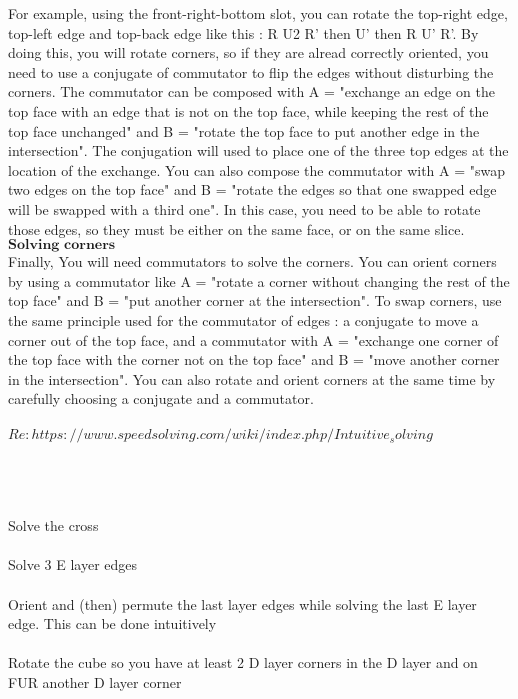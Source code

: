 \documentclass{article}
\begin{document}
For example, using the front-right-bottom slot, you can rotate the top-right edge, top-left edge and top-back edge like this : R U2 R' then U' then R U' R'.
By doing this, you will rotate corners, so if they are alread correctly oriented, you need to use a conjugate of commutator to flip the edges without disturbing the corners. The commutator can be composed with A = "exchange an edge on the top face with an edge that is not on the top face, while keeping the rest of the top face unchanged" and B = "rotate the top face to put another edge in the intersection". The conjugation will used to place one of the three top edges at the location of the exchange.
You can also compose the commutator with A = "swap two edges on the top face" and B = "rotate the edges so that one swapped edge will be swapped with a third one". In this case, you need to be able to rotate those edges, so they must be either on the same face, or on the same slice.
\\$\textbf{Solving corners}$\\Finally, You will need commutators to solve the corners.
You can orient corners by using a commutator like A = "rotate a corner without changing the rest of the top face" and B = "put another corner at the intersection".
To swap corners, use the same principle used for the commutator of edges : a conjugate to move a corner out of the top face, and a commutator with A = "exchange one corner of the top face with the corner not on the top face" and B = "move another corner in the intersection".
You can also rotate and orient corners at the same time by carefully choosing a conjugate and a commutator.
\\\\
$Re:https://www.speedsolving.com/wiki/index.php/Intuitive_solving$
\\\\
\\\\Solve the cross
\\\\Solve 3 E layer edges
\\\\Orient and (then) permute the last layer edges while solving the last E layer edge. This can be done intuitively
\\\\Rotate the cube so you have at least 2 D layer corners in the D layer and on FUR another D layer corner
\end{document}
